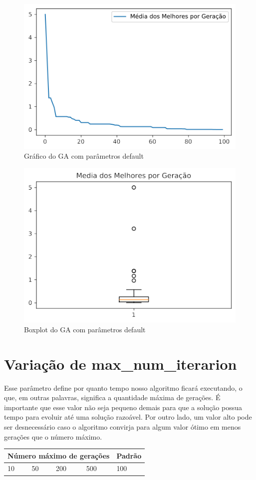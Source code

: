 \documentclass[12pt]{article}
\begin{document}
\begin{figure}[H]
	\centering
	\includegraphics[width=0.5\linewidth]{Imagens/graficoInicial}
	\caption{Gráfico do GA com parâmetros default}
	\label{fig:graficoinicial}
\end{figure}
\begin{figure}[H]
	\centering
	\includegraphics[width=0.5\linewidth]{Imagens/boxplotInicial}
	\caption{Boxplot do GA com parâmetros default}
	\label{fig:boxplotinicial}
\end{figure}


\section{Variação de max\_num\_iterarion} 

Esse parâmetro define por quanto tempo nosso algoritmo ficará executando, o que, em outras palavras, significa a quantidade máxima de gerações. É importante que esse valor não seja pequeno demais para que a solução possua tempo para evoluir até uma solução razoável. Por outro lado, um valor alto pode ser desnecessário caso o algoritmo convirja para algum valor ótimo em menos gerações que o número máximo.

\begin{table}[H]
	\centering
	\begin{tabular}{|l|l|l|l|l|}
		\hline
		\multicolumn{4}{|l|}{Número máximo de gerações}& Padrão \\ \hline
		10   & 50    & 200    & 500   & 100 \\ \hline
	\end{tabular}
\end{table}
\end{document}

